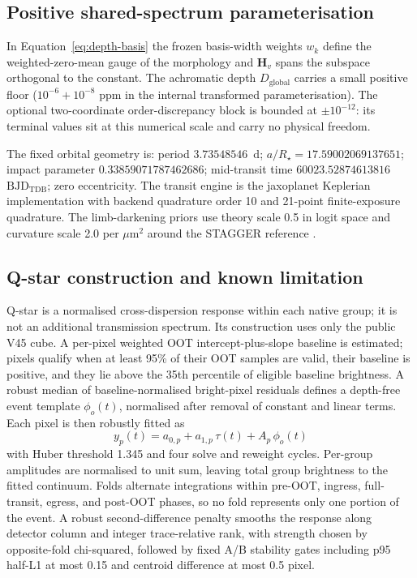 \subsection{Positive shared-spectrum parameterisation}

In Equation~\ref{eq:depth-basis} the frozen basis-width weights $w_k$ define
the weighted-zero-mean gauge of the morphology and $\bm{H}_v$ spans the
subspace orthogonal to the constant. The achromatic depth
$D_{\mathrm{global}}$ carries a small positive floor
($10^{-6}+10^{-8}$ ppm in the internal transformed parameterisation). The
optional two-coordinate order-discrepancy block is bounded at
$\pm 10^{-12}$: its terminal values sit at this numerical scale and carry no
physical freedom.

The fixed orbital geometry is: period $3.73548546$~d;
$a/R_\star=17.59002069137651$; impact parameter $0.33859071787462686$;
mid-transit time $60023.52874613816$~$\mathrm{BJD_{TDB}}$; zero eccentricity.
The transit engine is the jaxoplanet Keplerian implementation
\citep{Jaxoplanet2024} with backend quadrature order 10 and 21-point
finite-exposure quadrature. The limb-darkening priors use theory scale 0.5
in logit space and curvature scale 2.0 per $\mu\mathrm{m}^2$ around the
STAGGER reference \citep{MagicEtAl2015}.

\subsection{Q-star construction and known limitation}

Q-star is a normalised cross-dispersion response within each native group;
it is not an additional transmission spectrum. Its construction uses only
the public V45 cube. A per-pixel weighted OOT intercept-plus-slope baseline
is estimated; pixels qualify when at least 95\% of their OOT samples are
valid, their baseline is positive, and they lie above the 35th percentile of
eligible baseline brightness. A robust median of baseline-normalised
bright-pixel residuals defines a depth-free event template $\phi_o(t)$,
normalised after removal of constant and linear terms. Each pixel is then
robustly fitted as
\begin{equation}
 y_p(t)=a_{0,p}+a_{1,p}\,\tau(t)+A_p\,\phi_o(t)
\end{equation}
with Huber threshold 1.345 and four solve and reweight cycles. Per-group
amplitudes are normalised to unit sum, leaving total group brightness to the
fitted continuum. Folds alternate integrations within pre-OOT, ingress,
full-transit, egress, and post-OOT phases, so no fold represents only one
portion of the event. A robust second-difference penalty smooths the
response along detector column and integer trace-relative rank, with
strength chosen by opposite-fold chi-squared, followed by fixed A/B
stability gates including p95 half-L1 at most 0.15 and centroid difference
at most 0.5 pixel.

